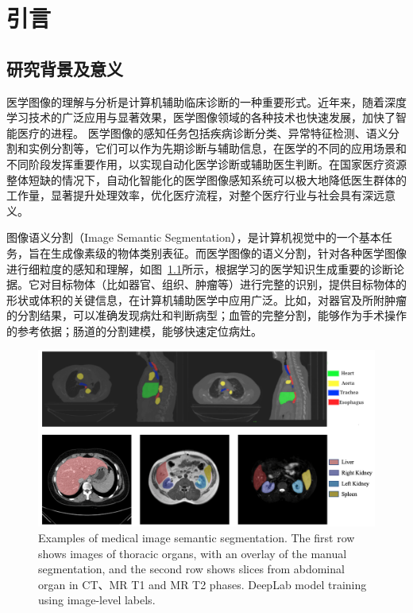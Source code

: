 \chapter{引言}

\section{研究背景及意义}
医学图像的理解与分析是计算机辅助临床诊断的一种重要形式。近年来，随着深度学习技术的广泛应用与显著效果，医学图像领域的各种技术也快速发展，加快了智能医疗的进程。
医学图像的感知任务包括疾病诊断分类、异常特征检测、语义分割和实例分割等，它们可以作为先期诊断与辅助信息，在医学的不同的应用场景和不同阶段发挥重要作用，以实现自动化医学诊断或辅助医生判断。在国家医疗资源整体短缺的情况下，自动化智能化的医学图像感知系统可以极大地降低医生群体的工作量，显著提升处理效率，优化医疗流程，对整个医疗行业与社会具有深远意义。


图像语义分割（Image Semantic Segmentation），是计算机视觉中的一个基本任务，旨在生成像素级的物体类别表征\citep{long2015fully,chen2017deeplab,ronneberger2015u,isensee2019automated}。而医学图像的语义分割，针对各种医学图像进行细粒度的感知和理解，如图~\ref{c1_fig1}所示，根据学习的医学知识生成重要的诊断论据。它对目标物体（比如器官、组织、肿瘤等）进行完整的识别，提供目标物体的形状或体积的关键信息，在计算机辅助医学中应用广泛。比如，对器官及所附肿瘤的分割结果，可以准确发现病灶和判断病型；血管的完整分割，能够作为手术操作的参考依据；肠道的分割建模，能够快速定位病灶。

    \begin{figure}[t!]
        \centering 
        \includegraphics[width=1.0\textwidth]{img/c1/intro_1.png}
        {Examples of medical image semantic segmentation. The first row shows images of thoracic organs, with an overlay of the manual segmentation, and the second row shows slices from abdominal organ in CT、MR T1 and MR T2 phases.
        DeepLab model training using image-level labels.}
        \label{c1_fig1}
    \end{figure}

